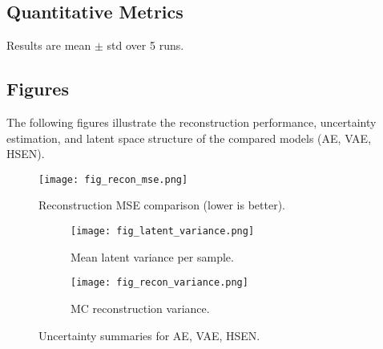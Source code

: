 \documentclass[12pt,a4paper]{article}
\begin{document}
\subsection{Quantitative Metrics}
\begin{center}
\renewcommand{\arraystretch}{1.3}
\small
{}

\vspace{.5em} 
\small Results are mean $\pm$ std over 5 runs.
\end{center}

\subsection{Figures}
The following figures illustrate the reconstruction performance, uncertainty estimation, 
and latent space structure of the compared models (AE, VAE, HSEN).

\begin{figure}[h!]
  \centering
  \texttt{[image: fig\_recon\_mse.png]}
  \caption{Reconstruction MSE comparison (lower is better).}
  \label{fig:mse}
\end{figure}

\begin{figure}[h!]
  \centering
  \begin{subfigure}{0.48\linewidth}
    \centering
    \texttt{[image: fig\_latent\_variance.png]}
    \caption{Mean latent variance per sample.}
    \label{fig:latvar}
  \end{subfigure}\hfill
  \begin{subfigure}{0.48\linewidth}
    \centering
    \texttt{[image: fig\_recon\_variance.png]}
    \caption{MC reconstruction variance.}
    \label{fig:recvar}
  \end{subfigure}
  \caption{Uncertainty summaries for AE, VAE, HSEN.}
  \label{fig:uncertainty}
\end{figure}
\end{document}
